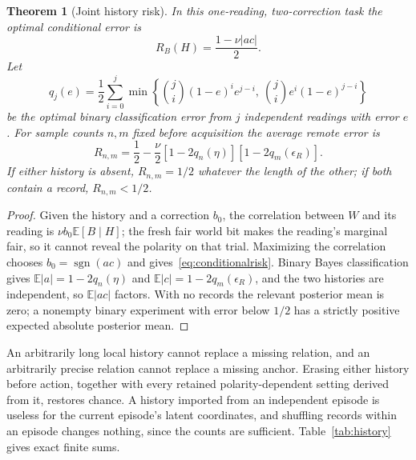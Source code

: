 \documentclass[11pt,a4paper]{article}
\newtheorem{theorem}[definition]{Theorem}
\newcommand{\E}{\mathbb E}
\newcommand{\sgn}{\operatorname{sgn}}
\begin{document}
\begin{theorem}[Joint history risk]\label{thm:risk}
In this one-reading, two-correction task the optimal conditional error is
\begin{equation}\label{eq:conditionalrisk}
 R_B(H)=\frac{1-\nu|ac|}{2}.
\end{equation}
Let
\begin{equation}\label{eq:q}
 q_j(e)=\frac12\sum_{i=0}^j\min\!\left\{\binom{j}{i}(1-e)^ie^{j-i},\ \binom{j}{i}e^i(1-e)^{j-i}\right\}
\end{equation}
be the optimal binary classification error from $j$ independent readings with error $e$. For sample counts $n,m$ fixed before acquisition the average remote error is
\begin{equation}\label{eq:averagerisk}
 R_{n,m}=\frac12-\frac\nu2[1-2q_n(\eta)][1-2q_m(\epsilon_R)].
\end{equation}
If either history is absent, $R_{n,m}=1/2$ whatever the length of the other; if both contain a record, $R_{n,m}<1/2$.
\end{theorem}
\begin{proof}
Given the history and a correction $b_0$, the correlation between $W$ and its reading is $\nu b_0\E[B\mid H]$; the fresh fair world bit makes the reading's marginal fair, so it cannot reveal the polarity on that trial. Maximizing the correlation chooses $b_0=\sgn(ac)$ and gives~\eqref{eq:conditionalrisk}. Binary Bayes classification gives $\E|a|=1-2q_n(\eta)$ and $\E|c|=1-2q_m(\epsilon_R)$, and the two histories are independent, so $\E|ac|$ factors. With no records the relevant posterior mean is zero; a nonempty binary experiment with error below $1/2$ has a strictly positive expected absolute posterior mean.
\end{proof}

An arbitrarily long local history cannot replace a missing relation, and an arbitrarily precise relation cannot replace a missing anchor. Erasing either history before action, together with every retained polarity-dependent setting derived from it, restores chance. A history imported from an independent episode is useless for the current episode's latent coordinates, and shuffling records within an episode changes nothing, since the counts are sufficient. Table~\ref{tab:history} gives exact finite sums.
\end{document}
